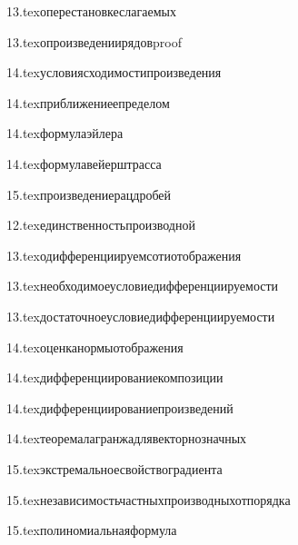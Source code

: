 {13.tex}{оперестановкеслагаемых}

{13.tex}{опроизведениирядовproof}

{14.tex}{условиясходимостипроизведения}

{14.tex}{приближениеепределом}

{14.tex}{формулаэйлера}

{14.tex}{формулавейерштрасса}

{15.tex}{произведениерацдробей}

{12.tex}{единственностьпроизводной}

{13.tex}{одифференциируемсотиотображения}

{13.tex}{необходимоеусловиедифференциируемости}

{13.tex}{достаточноеусловиедифференциируемости}

{14.tex}{оценканормыотображения}

{14.tex}{дифференциированиекомпозиции}

{14.tex}{дифференциированиепроизведений}

{14.tex}{теоремалагранжадлявекторнозначных}

{15.tex}{экстремальноесвойствоградиента}

{15.tex}{независимостьчастныхпроизводныхотпорядка}

{15.tex}{полиномиальнаяформула}

